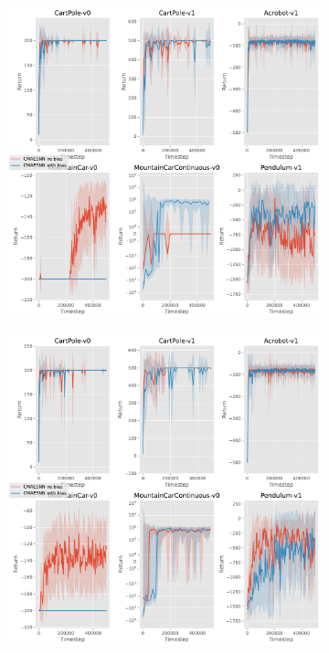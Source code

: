 \documentclass[12pt,a4paper]{article}
\begin{document}
\begin{figure}[ht!]
  \begin{subfigure}[ht!]{0.35\textwidth}
    \includegraphics[width=\textwidth]{../plotting/plots/plot_bias_perf2.pdf}
    \caption{}
  \end{subfigure}
  \hspace{0.05\textwidth}
  \begin{subfigure}[ht!]{0.35\textwidth}
    \includegraphics[width=\textwidth]{../plotting/plots/plot_bias_perf3.pdf}
    \caption{}
  \end{subfigure}


\end{figure}
\end{document}

